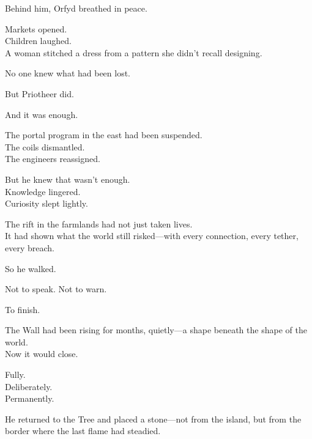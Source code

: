 \documentclass[9pt]{article}
\begin{document}
\vspace{0.5em}
Behind him, Orfyd breathed in peace.

\vspace{0.5em}
Markets opened.\\
Children laughed.\\
A woman stitched a dress from a pattern she didn’t recall designing.

\vspace{0.5em}
No one knew what had been lost.

\vspace{0.5em}
But Priotheer did.

\vspace{0.5em}
And it was enough.

\vspace{0.5em}
The portal program in the east had been suspended.\\
The coils dismantled.\\
The engineers reassigned.

\vspace{0.5em}
But he knew that wasn’t enough.\\
Knowledge lingered.\\
Curiosity slept lightly.

\vspace{0.5em}
The rift in the farmlands had not just taken lives.\\
It had shown what the world still risked---with every connection, every tether, every breach.

\vspace{0.5em}
So he walked.

\vspace{0.5em}
Not to speak. Not to warn.

\vspace{0.5em}
To finish.

\vspace{0.5em}
The Wall had been rising for months, quietly---a shape beneath the shape of the world.\\
Now it would close.

\vspace{0.5em}
Fully.\\
Deliberately.\\
Permanently.

\vspace{0.5em}
He returned to the Tree and placed a stone---not from the island, but from the border where the last flame had steadied.
\end{document}
